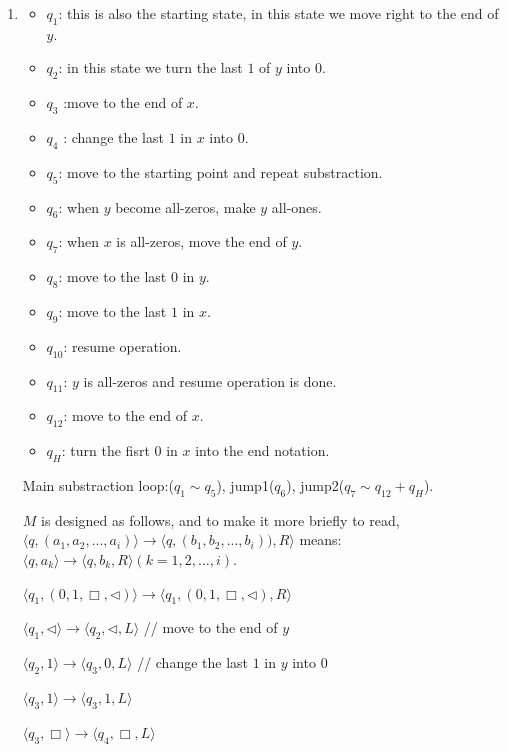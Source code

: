 \documentclass[12pt,a4paper]{article}
\makeatletter
\newtheorem*{solution}{Solution}
\theoremstyle{definition}
\renewenvironment{solution}[1][Solution] {\par\pushQED{\qed}\normalfont\topsep6\p@\@plus6\p@\relax\trivlist\item[\hskip\labelsep\bfseries#1\@addpunct{.}]\ignorespaces}{\popQED\endtrivlist\@endpefalse} \makeatother
\makeatother
\begin{document}
\begin{enumerate}
\begin{solution}
\begin{itemize}
	\item \textbf{$q_1$}: this is also the starting state, in this state we move right to the end of $y$.
	\item \textbf{$q_2$}: in this state we turn the last $1$ of $y$ into $0$.
	\item \textbf{$q_3$} :move to the end of $x$.
	\item \textbf{$q_4$} : change the last $1$ in $x$ into $0$.
	\item \textbf{$q_5$}: move to the starting point and repeat substraction.
	\item \textbf{$q_6$}: when $y$ become all-zeros, make $y$ all-ones.
	\item \textbf{$q_7$}: when $x$ is all-zeros, move the end of $y$.
	\item \textbf{$q_8$}: move to the last $0$ in $y$.
	\item \textbf{$q_9$}: move to the last $1$ in $x$.
	\item \textbf{$q_{10}$}: resume operation.
	\item \textbf{$q_{11}$}: $y$ is all-zeros and resume operation is done.
	\item \textbf{$q_{12}$}: move to the end of $x$.
	\item \textbf{$q_{H}$}: turn the fisrt $0$ in $x$ into the end notation.
\end{itemize}

Main substraction loop:($q_1 \sim q_5$), jump1($q_6$), jump2($q_7 \sim q_{12} +  q_H$).

$M$ is designed as follows, and to make it more briefly to read, $\langle q, (a_1, a_2, ..., a_i) \rangle \rightarrow \langle q, (b_1, b_2, ..., b_i)),  R\rangle$ means:
$\langle q, a_k \rangle \rightarrow \langle q, b_k,  R\rangle(k = 1, 2, ..., i)$.

$\langle q_1, (0,1,\Box,\triangleleft) \rangle \rightarrow \langle q_1, (0,1,\Box,\triangleleft),  R\rangle$ 

 $\langle q_1, \triangleleft \rangle \rightarrow \langle q_2, \triangleleft,  L\rangle$ // move to the end of $y$

$\langle q_2, 1 \rangle \rightarrow \langle q_3, 0,  L\rangle$ // change the last $1$ in $y$ into $0$

$\langle q_3, 1 \rangle \rightarrow \langle q_3, 1,  L\rangle$

$\langle q_3, \Box \rangle \rightarrow \langle q_4, \Box,   L\rangle$ 


\end{solution}
\end{enumerate}
\end{document}
